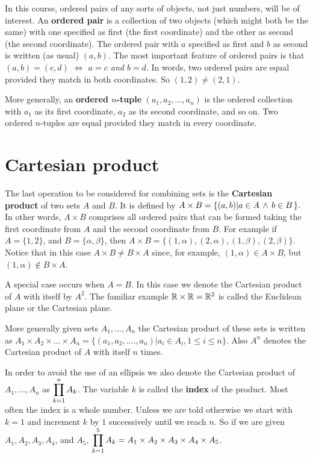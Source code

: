 In this course, ordered pairs of
any sorts of objects, not just numbers, will be of interest. 
An { \bfseries ordered pair} is a collection of two objects (which might both be the
same) with one specified as first (the first coordinate) and the other as second 
(the second coordinate). The ordered pair with $a$ specified as first and $b$ as second is
written (as usual) $(a,b)$. The most important feature of ordered pairs
is that {\it $(a,b) = (c,d)$ $\iff$ $a=c$ and $b=d$}. 
In words, two ordered pairs are equal
provided they match in both coordinates. So $(1,2)\neq (2,1)$.

More generally,
an { \bfseries ordered $n$-tuple} $(a_1, a_2, ..., a_n)$ is the ordered collection 
with $a_1$ as its
first coordinate, $a_2$ as its second coordinate, and so on. Two ordered $n$-tuples are
equal provided they match in every coordinate.

\section{Cartesian product}
The last operation to be considered for combining sets is the { \bfseries Cartesian product} 
of two 
sets $A$ and $B$. It
is defined by
$\displaystyle A\times B=\{(a,b)|a\in A\,\wedge\, b\in B\,\}.$ In other words, $A\times B$ comprises
all ordered pairs that can be formed taking the first coordinate from $A$ and the second
coordinate from $B$. 
For example if $A=\{1,2\}$, and $B=\{\alpha, \beta\}$, then 
$A\times B=\{(1,\alpha), (2,\alpha), (1, \beta), 
(2, \beta)\}$. Notice that in this case $A\times B \neq B\times A$ since, for
example, $(1,\alpha)\in A\times B$, but $(1,\alpha)\not\in B\times A$.




A special case occurs when $A=B$. In this case we denote the Cartesian product of 
$A$ with itself
by $A^2$. The familiar example $\mathbb{R}\times\mathbb{R} = \mathbb{R}^2$ is called the Euclidean plane or the 
Cartesian plane.

More generally given sets $A_1, ..., A_n$ the Cartesian product of these sets is written as
$A_1\times A_2\times ...\times A_n=\{(a_1, a_2,...., a_n)| a_i\in A_i, 1\leq i\leq n\}$.
Also $A^n$ denotes the Cartesian product of $A$ with itself $n$ times. 

In order to avoid the use of an ellipsis we also denote the Cartesian product of 
$A_1, ..., A_n$
as $\displaystyle{\prod_{k=1}^n A_k}$. The variable $k$ is called the { \bfseries index} of the product.
Most often the index is a whole number. Unless we are told otherwise we start with $k=1$
and increment $k$ by $1$ successively until we reach $n$. So if we are given $A_1, A_2, A_3, 
A_4$, and $A_5$, $\displaystyle{\prod_{k=1}^5 A_k=A_1\times A_2\times A_3\times A_4\times A_5}$.



